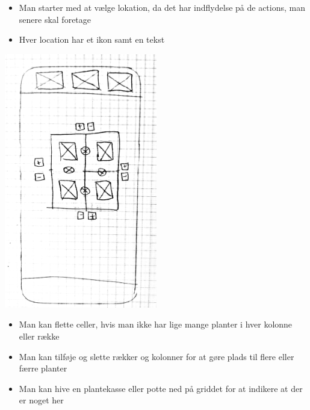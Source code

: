 \begin{itemize}
    \item Man starter med at vælge lokation, da det har indflydelse på de actions, man senere skal foretage
    \item Hver location har et ikon samt en tekst
\end{itemize}

\includegraphics[width=0.5\textwidth]{img/s1-8.jpg}\\

\begin{itemize}
    \item Man kan flette celler, hvis man ikke har lige mange planter i hver kolonne eller række
    \item Man kan tilføje og slette rækker og kolonner for at gøre plads til flere eller færre planter
    \item Man kan hive en plantekasse eller potte ned på griddet for at indikere at der er noget her
\end{itemize}

